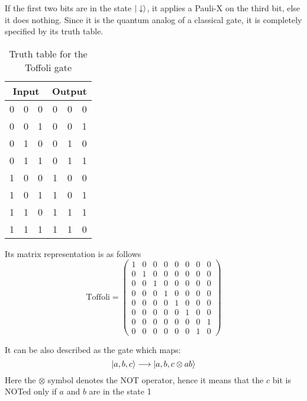 If the first two bits are in the state $|\downarrow\rangle$, it applies a Pauli-X on the third bit, else it does nothing. Since it is the quantum analog of a classical gate, it is completely specified by its truth table.
\begin{table}[h!]
\begin{center}
\begin{tabular}{rrr|rrr}
\multicolumn{ 3}{c|}{Input} & \multicolumn{ 3}{c}{Output} \\ \hline
0 & 0 & 0 & 0 & 0 & 0 \\ %
0 & 0 & 1 & 0 & 0 & 1 \\ %
0 & 1 & 0 & 0 & 1 & 0 \\ %
0 & 1 & 1 & 0 & 1 & 1 \\ %
1 & 0 & 0 & 1 & 0 & 0 \\ %
1 & 0 & 1 & 1 & 0 & 1 \\ %
1 & 1 & 0 & 1 & 1 & 1 \\ %
1 & 1 & 1 & 1 & 1 & 0 \\ %
\end{tabular}
\end{center}
\vspace{-15pt}\caption{Truth table for the Toffoli gate}
\end{table}
Its matrix representation is as follows
\begin{equation}
  \text{Toffoli} = \left(\begin{array}{cccccccc}
  1 & 0 & 0 & 0 & 0 & 0 & 0 & 0 \\
  0 & 1 & 0 & 0 & 0 & 0 & 0 & 0 \\
  0 & 0 & 1 & 0 & 0 & 0 & 0 & 0 \\
  0 & 0 & 0 & 1 & 0 & 0 & 0 & 0 \\
  0 & 0 & 0 & 0 & 1 & 0 & 0 & 0 \\
  0 & 0 & 0 & 0 & 0 & 1 & 0 & 0 \\
  0 & 0 & 0 & 0 & 0 & 0 & 0 & 1 \\
  0 & 0 & 0 & 0 & 0 & 0 & 1 & 0
  \end{array}\right)
\end{equation}

It can be also described as the gate which maps:
\begin{equation}
  |a,b,c\rangle\longrightarrow|a,b,c\otimes ab\rangle
\end{equation}
Here the $\otimes$ symbol denotes the NOT operator, hence it means that the $c$ bit is NOTed only if $a$ and $b$ are in the state 1

